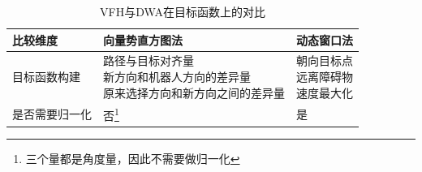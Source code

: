 \documentclass[../main.tex]{subfiles}
\begin{document}
\begin{enumerate}
\begin{table}[H]
    \centering
    \small
    \begin{tabular}{
        >{\centering\arraybackslash}m{4cm}
        >{\centering\arraybackslash}m{5.5cm}
        >{\centering\arraybackslash}m{5.5cm}
    }
        \toprule
        \textbf{比较维度} & \textbf{向量势直方图法} & \textbf{动态窗口法} \\
        \midrule
        目标函数构建 & 
        \makecell[{{p{5.5cm}}}]{路径与目标对齐量 \\ 新方向和机器人方向的差异量 \\ 原来选择方向和新方向之间的差异量} &
        \makecell[{{p{5.5cm}}}]{朝向目标点 \\ 远离障碍物 \\ 速度最大化} \\
        \midrule
        是否需要归一化 & 否\footnote{三个量都是角度量，因此不需要做归一化} & 是 \\
        \bottomrule
    \end{tabular}
    \caption{VFH与DWA在目标函数上的对比}
\end{table}


    \end{enumerate}
\end{document}
